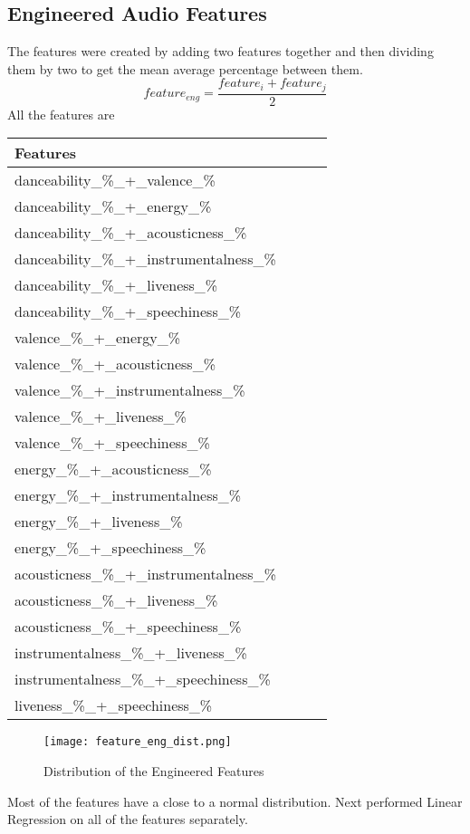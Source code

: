 \documentclass[titlepage]{article}
\begin{document}
\subsection*{Engineered Audio Features} 
The features were created by adding two features together and then dividing them by two to get the mean average percentage between them. 
\begin{equation}
    feature_{eng} = \frac{feature_i + feature_j}{2}
\end{equation}
\noindent All the features are 
\begin{table}[H]
    \centering
    \begin{tabular}{lll}
    \hline
        Features  \\ \hline
        danceability\_\%\_+\_valence\_\% & ~ & ~ \\ 
        danceability\_\%\_+\_energy\_\% & ~ & ~ \\ 
        danceability\_\%\_+\_acousticness\_\% & ~ & ~ \\ 
        danceability\_\%\_+\_instrumentalness\_\% & ~ & ~ \\ 
        danceability\_\%\_+\_liveness\_\% & ~ & ~ \\ 
        danceability\_\%\_+\_speechiness\_\% & ~ & ~ \\ 
        valence\_\%\_+\_energy\_\% & ~ & ~ \\ 
        valence\_\%\_+\_acousticness\_\% & ~ & ~ \\ 
        valence\_\%\_+\_instrumentalness\_\% & ~ & ~ \\ 
        valence\_\%\_+\_liveness\_\% & ~ & ~ \\ 
        valence\_\%\_+\_speechiness\_\% & ~ & ~ \\ 
        energy\_\%\_+\_acousticness\_\% & ~ & ~ \\ 
        energy\_\%\_+\_instrumentalness\_\% & ~ & ~ \\ 
        energy\_\%\_+\_liveness\_\% & ~ & ~ \\ 
        energy\_\%\_+\_speechiness\_\% & ~ & ~ \\ 
        acousticness\_\%\_+\_instrumentalness\_\% & ~ & ~ \\ 
        acousticness\_\%\_+\_liveness\_\% & ~ & ~ \\ 
        acousticness\_\%\_+\_speechiness\_\% & ~ & ~ \\ 
        instrumentalness\_\%\_+\_liveness\_\% & ~ & ~ \\ 
        instrumentalness\_\%\_+\_speechiness\_\% & ~ & ~ \\ 
        liveness\_\%\_+\_speechiness\_\% \\ \hline
    \end{tabular}
\end{table} 
\begin{figure}[H]
    \centering 
    \hspace*{-2cm}
    \texttt{[image: feature\_eng\_dist.png]}
    \caption{Distribution of the Engineered Features }
    \label{fig:enter-label}
\end{figure} 
\noindent Most of the features have a close to a normal distribution. Next performed Linear Regression on all of the features separately.  
\end{document}
